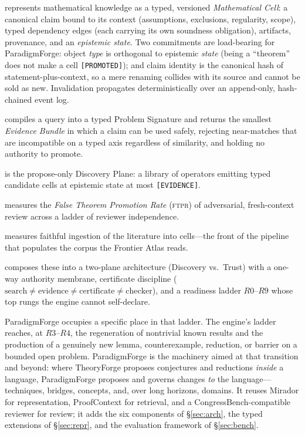 \documentclass[11pt]{article}
\theoremstyle{definition}
\theoremstyle{remark}
\newcommand{\state}[1]{\texttt{[#1]}}
\newcommand{\ftpr}{\textsc{ftpr}}
\newcommand{\PF}{ParadigmForge}
\begin{document}
\begin{description}[leftmargin=1.4em,itemsep=2pt]
  \item[Mirador] \citep{lucius2026mirador} represents mathematical knowledge as a
  typed, versioned \emph{Mathematical Cell}: a canonical claim bound to its context (assumptions,
  exclusions, regularity, scope), typed dependency edges (each carrying its own soundness
  obligation), artifacts, provenance, and an \emph{epistemic state}. Two commitments are
  load-bearing for \PF{}: object \emph{type} is orthogonal to epistemic \emph{state} (being a
  ``theorem'' does not make a cell \state{PROMOTED}); and claim identity is the canonical hash of
  statement-plus-context, so a mere renaming collides with its source and cannot be sold as new.
  Invalidation propagates deterministically over an append-only, hash-chained event log.
  \item[ProofContext] \citep{lucius2026proofcontext} compiles a query into a typed Problem
  Signature and returns the smallest \emph{Evidence Bundle} in which a claim can be used safely,
  rejecting near-matches that are incompatible on a typed axis regardless of similarity, and holding
  no authority to promote.
  \item[TheoryForge] \citep{lucius2026theoryforge} is the propose-only Discovery Plane: a library of
  operators emitting typed candidate cells at epistemic state at most \state{EVIDENCE}.
  \item[CongressBench] \citep{lucius2026congressbench} measures the \emph{False Theorem Promotion
  Rate} (\ftpr{}) of adversarial, fresh-context review across a ladder of reviewer independence.
  \item[MathIngestBench] \citep{lucius2026mathingest} measures faithful ingestion of the literature
  into cells---the front of the pipeline that populates the corpus the Frontier Atlas reads.
  \item[Bourbaki Engine] \citep{lucius2026bourbaki} composes these into a two-plane architecture
  (Discovery vs.\ Trust) with a one-way authority membrane, certificate discipline
  ($\text{search} \neq \text{evidence} \neq \text{certificate} \neq \text{checker}$), and a
  readiness ladder $R0$--$R9$ whose top rungs the engine cannot self-declare.
\end{description}

\PF{} occupies a specific place in that ladder. The engine's ladder reaches, at $R3$--$R4$, the
regeneration of nontrivial known results and the production of a genuinely new lemma, counterexample,
reduction, or barrier on a bounded open problem. \PF{} is the machinery aimed at that transition and
beyond: where TheoryForge proposes conjectures and reductions \emph{inside} a language, \PF{}
proposes and governs changes \emph{to} the language---techniques, bridges, concepts, and, over long
horizons, domains. It reuses Mirador for representation, ProofContext for retrieval, and a
CongressBench-compatible reviewer for review; it adds the six components of \S\ref{sec:arch}, the
typed extensions of \S\ref{sec:repr}, and the evaluation framework of \S\ref{sec:bench}.
\end{document}
